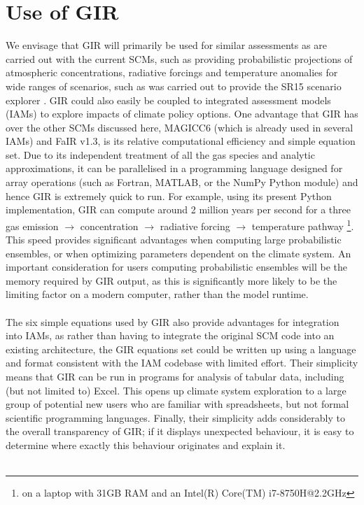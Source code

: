 \documentclass[gmd, manuscript]{copernicus}
\begin{document}
\section{Use of GIR}
We envisage that GIR will primarily be used for similar assessments as are carried out with the current SCMs, such as providing probabilistic projections of atmospheric concentrations, radiative forcings and temperature anomalies for wide ranges of scenarios, such as was carried out to provide the SR15 scenario explorer \citep{Huppmann:2018:scenario-data}. GIR could also easily be coupled to integrated assessment models (IAMs) to explore impacts of climate policy options. One advantage that GIR has over the other SCMs discussed here, MAGICC6 (which is already used in several IAMs) and FaIR v1.3, is its relative computational efficiency and simple equation set. Due to its independent treatment of all the gas species and analytic approximations, it can be parallelised in a programming language designed for array operations (such as Fortran, MATLAB, or the NumPy Python module) and hence GIR is extremely quick to run. For example, using its present Python implementation, GIR can compute around 2 million years per second for a three gas emission $\rightarrow$ concentration $\rightarrow$ radiative forcing $\rightarrow$ temperature pathway \footnote{on a laptop with 31GB RAM and an Intel(R) Core(TM) i7-8750H@2.2GHz}. This speed provides significant advantages when computing large probabilistic ensembles, or when optimizing parameters dependent on the climate system. An important consideration for users computing probabilistic ensembles will be the memory required by GIR output, as this is significantly more likely to be the limiting factor on a modern computer, rather than the model runtime.\\\\
The six simple equations used by GIR also provide advantages for integration into IAMs, as rather than having to integrate the original SCM code into an existing architecture, the GIR equations set could be written up using a language and format consistent with the IAM codebase with limited effort. Their simplicity means that GIR can be run in programs for analysis of tabular data, including (but not limited to) Excel. This opens up climate system exploration to a large group of potential new users who are familiar with spreadsheets, but not formal scientific programming languages. Finally, their simplicity adds considerably to the overall transparency of GIR; if it displays unexpected behaviour, it is easy to determine where exactly this behaviour originates and explain it.\\\\
\end{document}
